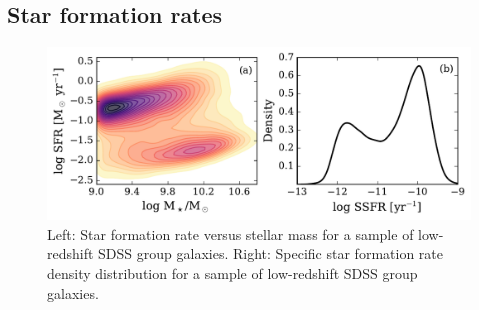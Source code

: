 \subsection{Star formation rates}
\label{sec:sfr}

\begin{figure}[!ht]
  \centering
  \includegraphics[width=\textwidth]{m_sfr.pdf}
  \caption[SFR versus stellar mass (left) and SSFR distribution
    (right) for SDSS group galaxies]{Left: Star formation rate versus stellar mass for a sample
    of low-redshift SDSS group galaxies.  Right: Specific star
    formation rate density distribution for a sample of low-redshift
    SDSS group galaxies.}
  \label{fig:m_sfr}
\end{figure}

